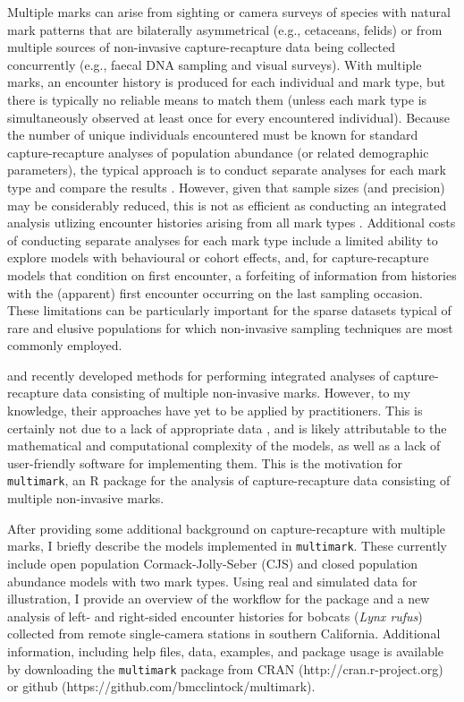 \documentclass[12pt]{article}
\begin{document}
Multiple marks can arise from sighting or camera surveys of species with natural mark patterns that are bilaterally asymmetrical (e.g., cetaceans, felids) or from multiple sources of non-invasive capture-recapture data being collected concurrently (e.g., faecal DNA sampling and visual surveys). With multiple marks, an encounter history is produced for each individual and mark type, but there is typically no reliable means to match them (unless each mark type is simultaneously observed at least once for every encountered individual). Because the number of unique individuals encountered must be known for standard capture-recapture analyses of population abundance (or related demographic parameters), the typical approach is to conduct separate analyses for each mark type and compare the results \citep[e.g.,][]{WilsonEtAl1999,BerrowEtAl2012,NairEtAl2012}. However, given that sample sizes (and precision) may be considerably reduced, this is not as efficient as conducting an integrated analysis utlizing encounter histories arising from all mark types \citep{McClintockEtAl2013a}. Additional costs of conducting separate analyses for each mark type include a limited ability to explore models with behavioural or cohort effects, and, for capture-recapture models that condition on first encounter, a forfeiting of information from histories with the (apparent) first encounter occurring on the last sampling occasion. These limitations can be particularly important for the sparse datasets typical of rare and elusive populations for which non-invasive sampling techniques are most commonly employed. 

\cite{BonnerHolmberg2013} and \cite{McClintockEtAl2013a} recently developed methods for performing integrated analyses of capture-recapture data consisting of multiple non-invasive marks. However, to my knowledge, their approaches have yet to be applied by practitioners. This is certainly not due to a lack of appropriate data \citep[e.g.,][]{WilsonEtAl1999,HolmbergEtAl2008,MadonEtAl2011,BerrowEtAl2012,NairEtAl2012}, and is likely attributable to the mathematical and computational complexity of the models, as well as a lack of user-friendly software for implementing them. This is the motivation for \verb|multimark|, an R \citep{RTeam2013} package for the analysis of capture-recapture data consisting of multiple non-invasive marks. 

After providing some additional background on capture-recapture with multiple marks, I briefly describe the models implemented in \verb|multimark|. These currently include open population Cormack-Jolly-Seber (CJS) and closed population abundance models \citep[e.g.,][]{WilliamsEtAl2002} with two mark types. Using real and simulated data for illustration, I provide an overview of the workflow for the package and a new analysis of left- and right-sided encounter histories for bobcats ({\it Lynx rufus}) collected from remote single-camera stations in southern California. Additional information, including help files, data, examples, and package usage is available by downloading the \verb|multimark| package from CRAN (http://cran.r-project.org) or github (https://github.com/bmcclintock/multimark).
\end{document}
